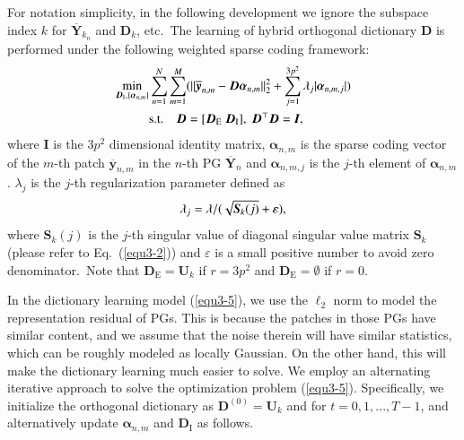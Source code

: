 For notation simplicity, in the following development we ignore the subspace index $k$ for $\bm{\overline{Y}}_{k_{n}}$ and $\bm{D}_{k}$, etc.\ The learning of hybrid orthogonal dictionary $\bm{D}$ is performed under the following weighted sparse coding
framework:
\vspace{-2mm}
\begin{equation}\label{equ3-5}
\vspace{-2mm}
\begin{split}
\min_{\bm{D}_{\text{I}},\{\bm{\alpha}_{n,m}\}}
&\sum_{n=1}^{N}\sum_{m=1}^{M}(\|\bm{\overline{y}}_{n,m}-\bm{D}\bm{\alpha}_{n,m}\|_{2}^{2}+\sum_{j=1}^{3p^{2}}\lambda_{j}|\bm{\alpha}_{n,m,j}|)
\\
&
\text{s.t.}
\quad
\bm{D}=[\bm{D}_{\text{E}}\ \bm{D}_{\text{I}}],\ \bm{D}^{\top}\bm{D} = \bm{I},
\end{split}
\end{equation}
where $\bm{I}$ is the $3p^{2}$ dimensional identity matrix, $\bm{\alpha}_{n,m}$ is the sparse coding vector of the $m$-th patch $\bm{\overline{y}}_{n,m}$ in the $n$-th PG $\bm{\overline{Y}}_{n}$ and $\bm{\alpha}_{n,m,j}$ is the $j$-th element of $\bm{\alpha}_{n,m}$. $\lambda_{j}$ is the $j$-th regularization parameter defined as
\vspace{-2mm}
\begin{equation}\label{equ3-6}
\vspace{-2mm}
\lambda_{j} = \lambda/(\sqrt{\bm{S}_{k}(j)}+\varepsilon),
\end{equation}
where $\bm{S}_{k}(j)$ is the $j$-th singular value of diagonal singular value matrix $\bm{S}_{k}$ (please refer to Eq.\ (\ref{equ3-2})) and $\varepsilon$ is a small positive number to avoid zero denominator.\ Note that $\bm{D}_{\text{E}}=\bm{U}_{k}$ if $r=3p^{2}$ and $\bm{D}_{\text{E}}=\emptyset$ if $r=0$.

In the dictionary learning model (\ref{equ3-5}), we use the $\ell_{2}$ norm to model the representation residual of PGs. This is because the patches in those PGs have similar content, and we assume that the noise therein will have similar statistics, which can be roughly modeled as locally Gaussian. On the other hand, this will make the dictionary learning much easier to solve. We employ an alternating iterative approach to solve the optimization problem (\ref{equ3-5}). Specifically, we initialize the orthogonal dictionary as $\bm{D}^{(0)}=\bm{U}_{k}$ and for $t=0,1, ...,T-1$, and alternatively update $\bm{\alpha}_{n,m}$ and $\bm{D}_{\text{I}}$ as follows.

